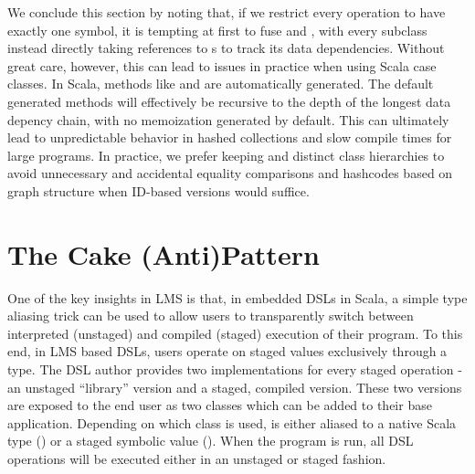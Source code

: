 We conclude this section by noting that, if we restrict every operation to have exactly one symbol,
it is tempting at first to fuse  and , with every
 subclass instead directly taking references to s to
track its data dependencies.
Without great care, however, this can lead to
issues in practice when using Scala case classes. In Scala, methods like
 and  are automatically generated.
The default generated methods will effectively be recursive to the depth of the longest data depency chain, with no memoization generated by default.
This can ultimately lead to unpredictable behavior in hashed collections and
slow compile times for large programs. In practice, we prefer keeping
 and  distinct class hierarchies to avoid unnecessary
and accidental equality comparisons and hashcodes based on graph structure when ID-based versions would suffice.

\section{The Cake (Anti)Pattern}
One of the key insights in LMS is that, in embedded DSLs in Scala,
a simple type aliasing trick can be used to allow users to transparently switch
between interpreted (unstaged) and compiled (staged) execution of their program.
To this end, in LMS based DSLs, users operate on staged values exclusively through a
 type. The DSL author provides two implementations for
every staged operation - an unstaged ``library'' version and a staged,
compiled version. These two versions are exposed to the end user as two classes
which can be added to their base application.
Depending on which class is used,  is either aliased to
a native Scala type ()
or a staged symbolic value (). When the program is run,
all DSL operations will be executed either in an unstaged or staged fashion.

